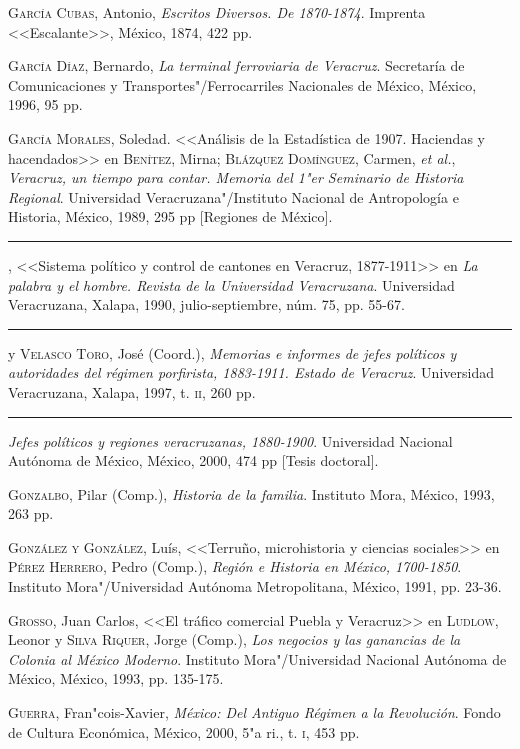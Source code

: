 \documentclass[14pt,twoside,final]{extbook} %
\begin{document}
\textsc{García Cubas}, Antonio, \emph{Escritos Diversos. De 1870-1874}. Imprenta <<Escalante>>, México, 1874, 422 pp.

\textsc{García Díaz}, Bernardo, \emph{La terminal ferroviaria de Veracruz}. Secretaría de Comunicaciones y Transportes"/Ferrocarriles Nacionales de México, México, 1996, 95 pp.

\textsc{García Morales}, Soledad. <<Análisis de la Estadística de 1907. Haciendas y
hacendados>> en \textsc{Benítez}, Mirna; \textsc{Blázquez Domínguez}, Carmen,
\emph{et al.}, \emph{Veracruz, un tiempo para contar. Memoria del 1"er Seminario de Historia Regional}. Universidad Veracruzana"/Instituto Nacional de Antropología e Historia, México, 1989, 295 pp [Regiones de México].

\rule{1cm}{0.4pt}, <<Sistema político y control de cantones en Veracruz, 1877-1911>> en \emph{La palabra y el hombre. Revista de la Universidad Veracruzana}. Universidad Veracruzana, Xalapa, 1990, julio-septiembre, núm. 75, pp. 55-67.

\rule{1cm}{0.4pt} y \textsc{Velasco Toro}, José (Coord.), \emph{Memorias e informes de jefes políticos y autoridades del régimen porfirista, 1883-1911. Estado de Veracruz}. Universidad
Veracruzana, Xalapa, 1997, t. \textsc{ii}, 260 pp.

\rule{1cm}{0.4pt} \emph{Jefes políticos y regiones veracruzanas, 1880-1900}. Universidad Nacional Autónoma de México, México, 2000, 474 pp [Tesis doctoral].

\textsc{Gonzalbo}, Pilar (Comp.), \emph{Historia de la familia}. Instituto Mora, México, 1993, 263 pp.

\textsc{González y González}, Luís, <<Terruño, microhistoria y ciencias sociales>> en \textsc{Pérez Herrero}, Pedro (Comp.), \emph{Región e Historia en México, \mbox{1700-1850}}. Instituto Mora"/Universidad Autónoma Metropolitana, México, 1991, pp. 23-36.

\textsc{Grosso}, Juan Carlos, <<El tráfico comercial Puebla y Veracruz>> en \textsc{Ludlow}, Leonor y \textsc{Silva Riquer}, Jorge (Comp.), \emph{Los negocios y las ganancias de la Colonia al México Moderno}. Instituto Mora"/Universidad Nacional Autónoma de México, México, 1993, pp. 135-175.

\textsc{Guerra}, Fran"cois-Xavier, \emph{México: Del Antiguo Régimen a la Revolución}. Fondo de Cultura Económica, México, 2000, 5"a ri., t. \textsc{i}, 453 pp.
\end{document}
